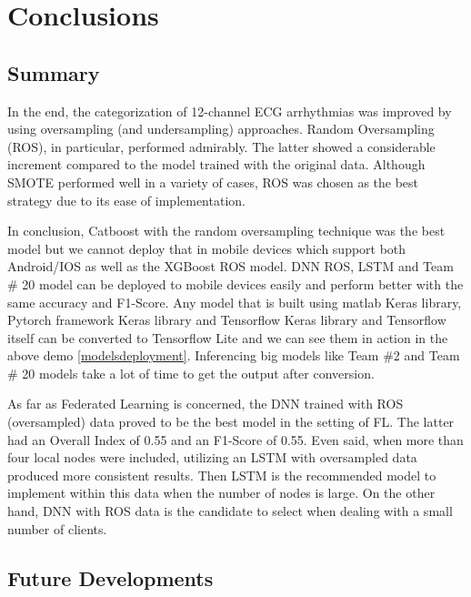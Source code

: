 \chapter{Conclusions} \label{chap6}

\section{Summary} \label{6summary}

In the end, the categorization of 12-channel ECG arrhythmias was improved by using oversampling (and undersampling) approaches. Random Oversampling (ROS), in particular, performed admirably. The latter showed a considerable increment compared to the model trained with the original data. Although SMOTE performed well in a variety of cases, ROS was chosen as the best strategy due to its ease of implementation.

In conclusion, Catboost with the random oversampling technique was the best model but we cannot deploy that in mobile devices which support both Android/IOS as well as the XGBoost ROS model. DNN ROS, LSTM and Team \# 20 model can be deployed to mobile devices easily and perform better with the same accuracy and F1-Score. Any model that is built using matlab Keras library, Pytorch framework Keras library and Tensorflow Keras library and Tensorflow itself can be converted to Tensorflow Lite and we can see them in action in the above demo \ref{modelsdeployment}. Inferencing big models like Team \#2 and Team \# 20 models take a lot of time to get the output after conversion. 

As far as Federated Learning is concerned, the DNN trained with ROS (oversampled) data proved to be the best model in the setting of FL. The latter had an Overall Index of 0.55 and an F1-Score of 0.55. Even said, when more than four local nodes were included, utilizing an LSTM with oversampled data produced more consistent results. Then LSTM is the recommended model to implement within this data when the number of nodes is large. On the other hand, DNN with ROS data is the candidate to select when dealing with a small number of clients.



\section{Future Developments} \label{6futuredevelopments}

